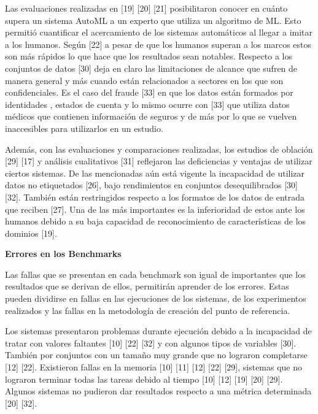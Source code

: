 Las evaluaciones realizadas en [19] [20] [21] posibilitaron conocer en cuánto supera un sistema AutoML a un experto que utiliza un algoritmo de ML. Esto permitió 
cuantificar el acercamiento de los sistemas automáticos al llegar a imitar a los humanos. Según [22] a pesar de que los humanos superan a los marcos estos son más 
rápidos lo que hace que los resultados sean notables. Respecto a los conjuntos de datos [30] deja en claro las limitaciones de alcance que sufren de manera general y más cuando están 
relacionados a sectores en los que son confidenciales. Es el caso del fraude [33] en que los datos están formados por identidades , estados de cuenta y lo mismo ocurre con [33] que utiliza 
datos médicos que contienen información de seguros y de más por lo que se vuelven inaccesibles para utilizarlos en un estudio.  

Además, con las evaluaciones y comparaciones realizadas, los estudios de oblación [29] [17] y análisis cualitativos [31] reflejaron las 
deficiencias y ventajas de utilizar ciertos sistemas. De las mencionadas aún está vigente la incapacidad de utilizar datos no etiquetados [26], bajo rendimientos en 
conjuntos desequilibrados [30] [32]. También están restringidos respecto a los formatos de los datos de entrada que reciben [27]. Una de las más importantes es la 
inferioridad de estos ante los humanos debido a su baja capacidad de reconocimiento de características de los dominios [19].

\begin{flushleft} 
    {\large { \textbf{Errores en los Benchmarks}}}\label{subsection:fallas_AutoML}
\end{flushleft}
Las fallas que se presentan en cada benchmark son igual de importantes que los resultados que se derivan de ellos, permitirán aprender de los errores. Estas pueden 
dividirse en fallas en las ejecuciones de los sistemas, de los experimentos realizados y las fallas en la metodología de creación del punto de referencia.

Los sistemas presentaron problemas durante ejecución debido a la incapacidad de tratar con valores faltantes [10] [22] [32] y con algunos tipos de variables [30]. También 
por   conjuntos con un tamaño muy grande que no lograron completarse [12] [22]. Existieron fallas en la memoria [10] [11] [12] [22] [29], sistemas que no lograron 
terminar todas las tareas debido al tiempo [10] [12] [19] [20] [29]. Algunos sistemas no pudieron dar resultados respecto a una métrica determinada [20] [32].

